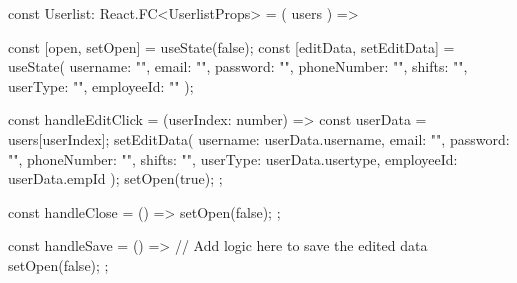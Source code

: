 const Userlist: React.FC<UserlistProps> = ({ users }) => {
  const [open, setOpen] = useState(false);
  const [editData, setEditData] = useState({
    username: "",
    email: "",
    password: "",
    phoneNumber: "",
    shifts: "",
    userType: "",
    employeeId: ""
  });

  const handleEditClick = (userIndex: number) => {
    const userData = users[userIndex];
    setEditData({
      username: userData.username,
      email: "",
      password: "",
      phoneNumber: "",
      shifts: "",
      userType: userData.usertype,
      employeeId: userData.empId
    });
    setOpen(true);
  };

  const handleClose = () => {
    setOpen(false);
  };

  const handleSave = () => {
    // Add logic here to save the edited data
    setOpen(false);
  };

}
